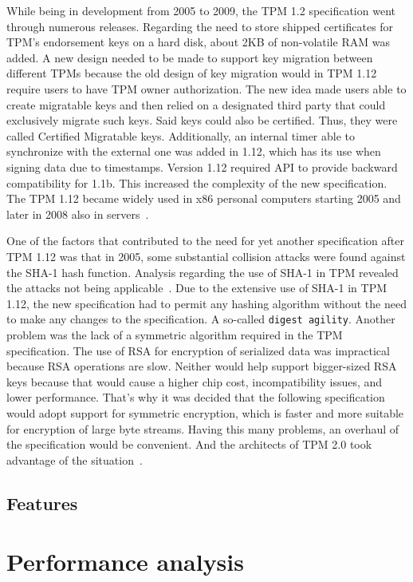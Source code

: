 While being in development from 2005 to 2009, the TPM 1.2 specification went through numerous releases. Regarding the need to store shipped certificates for TPM's endorsement keys on a hard disk, about 2KB of non-volatile RAM was added. A new design needed to be made to support key migration between different TPMs because the old design of key migration would in TPM 1.12 require users to have TPM owner authorization. The new idea made users able to create migratable keys and then relied on a designated third party that could exclusively migrate such keys. Said keys could also be certified. Thus, they were called Certified Migratable keys. Additionally, an internal timer able to synchronize with the external one was added in 1.12, which has its use when signing data due to timestamps. Version 1.12 required API to provide backward compatibility for 1.1b. This increased the complexity of the new specification. The TPM 1.12 became widely used in x86 personal computers starting 2005 and later in 2008 also in servers~\cite{arthur2015practical}.

One of the factors that contributed to the need for yet another specification after TPM 1.12 was that in 2005, some substantial collision attacks were found against the SHA-1 hash function. Analysis regarding the use of SHA-1 in TPM revealed the attacks not being applicable~\cite{tcg_tpm1.12_sha-1_uses}. Due to the extensive use of SHA-1 in TPM 1.12, the new specification had to permit any hashing algorithm without the need to make any changes to the specification. A so-called \texttt{digest agility}. Another problem was the lack of a symmetric algorithm required in the TPM specification. The use of RSA for encryption of serialized data was impractical because RSA operations are slow. Neither would help support bigger-sized RSA keys because that would cause a higher chip cost, incompatibility issues, and lower performance. That's why it was decided that the following specification would adopt support for symmetric encryption, which is faster and more suitable for encryption of large byte streams. Having this many problems, an overhaul of the specification would be convenient. And the architects of TPM 2.0 took advantage of the situation~\cite{arthur2015practical}.


\subsection{Features}


\section{Performance analysis}
